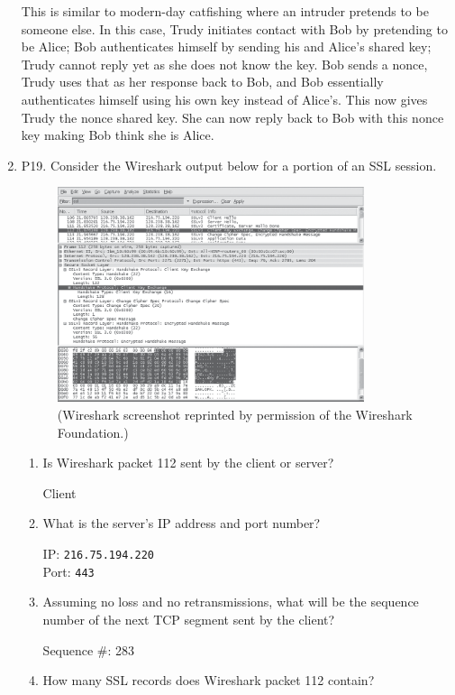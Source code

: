 \documentclass[12pt]{article}
\begin{document}
\begin{enumerate}
	\color{CrispBlue}This is similar to modern-day catfishing where an intruder pretends to be someone else. In this case, Trudy initiates contact with Bob by pretending to be Alice; Bob authenticates himself by sending his and Alice's shared key; Trudy cannot reply yet as she does not know the key. Bob sends a nonce, Trudy uses that as her response back to Bob, and Bob essentially authenticates himself using his own key instead of Alice's. This now gives Trudy the nonce shared key. She can now reply back to Bob with this nonce key making Bob think she is Alice.
	\color{black}
	\item P19. Consider the Wireshark output below for a portion of an SSL session.
	\setcounter{figure}{-1}
	\begin{figure}[h!]
	\centering
	\includegraphics[width=0.85\textwidth]{./Images/UnFig08-001.png}
	\caption{(Wireshark screenshot reprinted by permission of the Wireshark Foundation.)}
	\end{figure}
	\begin{enumerate}
		\item Is Wireshark packet 112 sent by the client or server?\par
		\color{CrispBlue}Client
		\color{black}
		\item What is the server’s IP address and port number?\par
		\color{CrispBlue}IP: \texttt{216.75.194.220}\\Port: \texttt{443}
		\color{black}
		\item Assuming no loss and no retransmissions, what will be the sequence number of the next TCP segment sent by the client?\par
		\color{CrispBlue}Sequence \#: 283
		\color{black}
		\item How many SSL records does Wireshark packet 112 contain?\par

\end{enumerate}
\end{enumerate}
\end{document}
